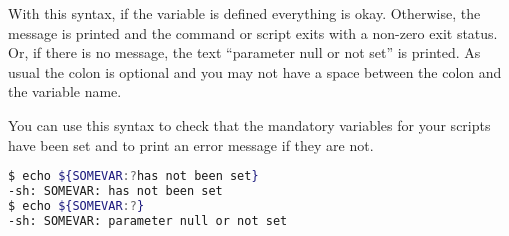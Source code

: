 With this syntax, if the variable is defined everything is okay. Otherwise, the
message is printed and the command or script exits with a non-zero exit status.
Or, if there is no message, the text ``parameter null or not set'' is printed.
As usual the colon is optional and you may not have a space between the colon
and the variable name.

You can use this syntax to check that the mandatory variables for your scripts
have been set and to print an error message if they are not.

\lstset{basicstyle=\scriptsize, numbers=left, captionpos=b, tabsize=4}
\begin{lstlisting}[caption=Default value assignment,language={bash},
breaklines=true,xleftmargin=15pt,label=lst:Default value assignment]
$ echo ${SOMEVAR:?has not been set}
-sh: SOMEVAR: has not been set
$ echo ${SOMEVAR:?}
-sh: SOMEVAR: parameter null or not set
\end{lstlisting}
